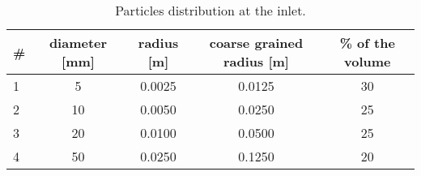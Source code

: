 \begin{table}[htbp]
  \centering
  
    \begin{tabular}{l|cccc}
    \hline
    \#    & diameter [mm] & radius [m] & coarse grained radius [m] & \% of the
    volume
    \\
    \hline
    1     & 5     & 0.0025 & 0.0125 & 30 \\
    2     & 10    & 0.0050 & 0.0250 & 25 \\
    3     & 20    & 0.0100 & 0.0500 & 25 \\
    4     & 50    & 0.0250 & 0.1250 & 20 \\
    \hline    
    \end{tabular}%
    \caption[Particles distribution at the inlet]{Particles distribution at the
    inlet.} \label{tab:16radii}%
\end{table}%
